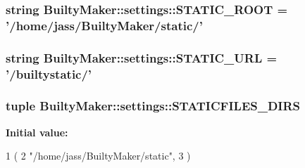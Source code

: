 \hypertarget{namespaceBuiltyMaker_1_1settings_a7d60f917627c15e4d6e3edb393b545e3}{
\subsubsection[{\-S\-T\-A\-T\-I\-C\-\_\-\-R\-O\-O\-T}]{\setlength{\rightskip}{0pt plus 5cm}string {\bf \-Builty\-Maker\-::settings\-::\-S\-T\-A\-T\-I\-C\-\_\-\-R\-O\-O\-T} = '/home/jass/\-Builty\-Maker/static/'}}\label{namespaceBuiltyMaker_1_1settings_a7d60f917627c15e4d6e3edb393b545e3}
\hypertarget{namespaceBuiltyMaker_1_1settings_acc4654aed90815f7b042342578725459}{
\subsubsection[{\-S\-T\-A\-T\-I\-C\-\_\-\-U\-R\-L}]{\setlength{\rightskip}{0pt plus 5cm}string {\bf \-Builty\-Maker\-::settings\-::\-S\-T\-A\-T\-I\-C\-\_\-\-U\-R\-L} = '/builtystatic/'}}\label{namespaceBuiltyMaker_1_1settings_acc4654aed90815f7b042342578725459}
\hypertarget{namespaceBuiltyMaker_1_1settings_a8db37f9e0004689a9e5788648db5000c}{
\subsubsection[{\-S\-T\-A\-T\-I\-C\-F\-I\-L\-E\-S\-\_\-\-D\-I\-R\-S}]{\setlength{\rightskip}{0pt plus 5cm}tuple {\bf \-Builty\-Maker\-::settings\-::\-S\-T\-A\-T\-I\-C\-F\-I\-L\-E\-S\-\_\-\-D\-I\-R\-S}}}\label{namespaceBuiltyMaker_1_1settings_a8db37f9e0004689a9e5788648db5000c}
{\bfseries \-Initial value\-:}
\begin{DoxyCode}
1 (
2     "/home/jass/BuiltyMaker/static",
3 )
\end{DoxyCode}
